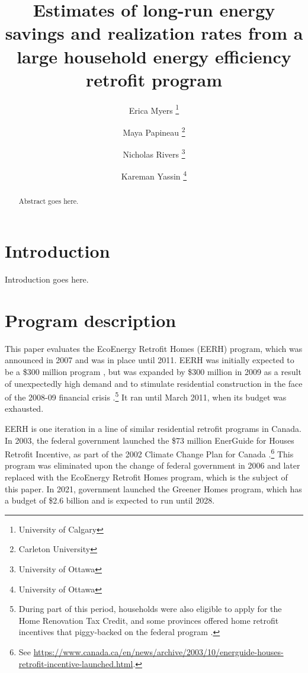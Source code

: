 \documentclass{article}
\author{
    Erica Myers \thanks{University of Calgary}
    \and
    Maya Papineau \thanks{Carleton University}
    \and
    Nicholas Rivers \thanks{University of Ottawa}
    \and 
    Kareman Yassin \thanks{University of Ottawa}
}
\title{
    Estimates of long-run energy savings and realization rates from a large household energy efficiency retrofit program
}
\begin{document}
\maketitle

\begin{abstract}
Abstract goes here.
\end{abstract}

\section{Introduction}
Introduction goes here.

\section{Program description}
This paper evaluates the EcoEnergy Retrofit Homes (EERH) program, which was announced in 2007 and was in place until 2011. EERH was initially expected to be a \$300 million program \citep{budget2007}, but was expanded by \$300 million in 2009 as a result of unexpectedly high demand and to stimulate residential construction in the face of the 2008-09 financial crisis \citep{budget2009}.\footnote{During part of this period, households were also eligible to apply for the Home Renovation Tax Credit, and some provinces offered home retrofit incentives that piggy-backed on the federal program \citep{rivers2016free}.} It ran until March 2011, when its budget was exhausted.

EERH is one iteration in a line of similar residential retrofit programs in Canada. In 2003, the federal government launched the \$73 million EnerGuide for Houses Retrofit Incentive, as part of the 2002 Climate Change Plan for Canada \citep{canada2002climateplan}.\footnote{See \url{https://www.canada.ca/en/news/archive/2003/10/energuide-houses-retrofit-incentive-launched.html}.} This program was eliminated upon the change of federal government in 2006 and later replaced with the EcoEnergy Retrofit Homes program, which is the subject of this paper. In 2021, government launched the Greener Homes program, which has a budget of \$2.6 billion and is expected to run until 2028.
\end{document}
